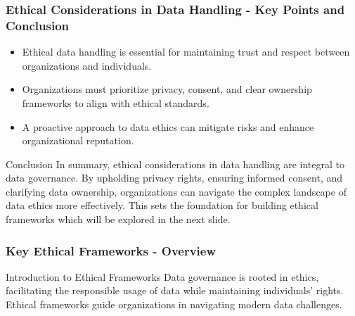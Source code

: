 \documentclass[aspectratio=169]{beamer}
\begin{document}
\begin{frame}[fragile]
    \frametitle{Ethical Considerations in Data Handling - Key Points and Conclusion}
    \begin{itemize}
        \item Ethical data handling is essential for maintaining trust and respect between organizations and individuals.
        \item Organizations must prioritize privacy, consent, and clear ownership frameworks to align with ethical standards.
        \item A proactive approach to data ethics can mitigate risks and enhance organizational reputation.
    \end{itemize}
    \begin{block}{Conclusion}
        In summary, ethical considerations in data handling are integral to data governance. By upholding privacy rights, ensuring informed consent, and clarifying data ownership, organizations can navigate the complex landscape of data ethics more effectively. This sets the foundation for building ethical frameworks which will be explored in the next slide.
    \end{block}
\end{frame}

\begin{frame}[fragile]
    \frametitle{Key Ethical Frameworks - Overview}
    \begin{block}{Introduction to Ethical Frameworks}
        Data governance is rooted in ethics, facilitating the responsible usage of data while maintaining individuals' rights. Ethical frameworks guide organizations in navigating modern data challenges.
    \end{block}
\end{frame}
\end{document}

